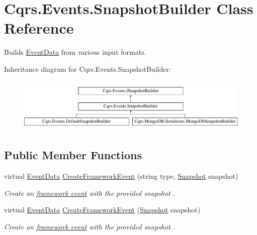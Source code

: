 \hypertarget{classCqrs_1_1Events_1_1SnapshotBuilder}{}\section{Cqrs.\+Events.\+Snapshot\+Builder Class Reference}
\label{classCqrs_1_1Events_1_1SnapshotBuilder}


Builds \hyperlink{classCqrs_1_1Events_1_1EventData}{Event\+Data} from various input formats.  


Inheritance diagram for Cqrs.\+Events.\+Snapshot\+Builder\+:\begin{figure}[H]
\begin{center}
\leavevmode
\includegraphics[height=2.616822cm]{classCqrs_1_1Events_1_1SnapshotBuilder}
\end{center}
\end{figure}
\subsection*{Public Member Functions}
\begin{DoxyCompactItemize}
\item 
virtual \hyperlink{classCqrs_1_1Events_1_1EventData}{Event\+Data} \hyperlink{classCqrs_1_1Events_1_1SnapshotBuilder_a1329007abf3aa02e4cddbebc669e4209_a1329007abf3aa02e4cddbebc669e4209}{Create\+Framework\+Event} (string type, \hyperlink{classCqrs_1_1Snapshots_1_1Snapshot}{Snapshot} snapshot)
\begin{DoxyCompactList}\small\item\em Create an \hyperlink{}{framework event} with the provided {\itshape snapshot} . \end{DoxyCompactList}\item 
virtual \hyperlink{classCqrs_1_1Events_1_1EventData}{Event\+Data} \hyperlink{classCqrs_1_1Events_1_1SnapshotBuilder_ae6c7cd51ef132fb9a2cc951753b453c3_ae6c7cd51ef132fb9a2cc951753b453c3}{Create\+Framework\+Event} (\hyperlink{classCqrs_1_1Snapshots_1_1Snapshot}{Snapshot} snapshot)
\begin{DoxyCompactList}\small\item\em Create an \hyperlink{}{framework event} with the provided {\itshape snapshot} . \end{DoxyCompactList}\end{DoxyCompactItemize}

